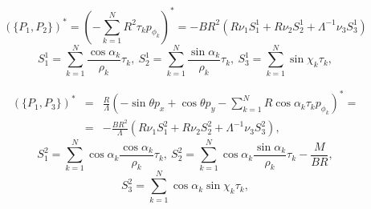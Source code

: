$$
(\{P_1,P_2\})^* = (-\sum\limits_{k=1}^{N} R^2\tau_kp_{\phi_k})^* =
-BR^2(R\nu_1 S_1^1 + R\nu_2 S_2^1 + \Lambda^{-1}\nu_3S_3^1)$$
$$
S_1^1 = \sum\limits_{k=1}^{N}\frac{\cos\alpha_k}{\rho_k}\tau_k,\
S_2^1 = \sum\limits_{k=1}^{N}\frac{\sin\alpha_k}{\rho_k}\tau_k,\
S_3^1 = \sum\limits_{k=1}^{N}\sin\chi_k\tau_k,
$$

\begin{eqnarray*}
(\{P_1,P_3\})^* &=& \frac{R}{\Lambda}\left(-\sin\theta p_x + \cos\theta p_y - \sum\limits_{k=1}^{N} R\cos\alpha_k\tau_kp_{\phi_k}\right)^* =\\
&=& -\frac{BR^2}{\Lambda}(R\nu_1 S_1^2 + R\nu_2 S_2^2 + \Lambda^{-1}\nu_3S_3^2),
\end{eqnarray*}
$$
S_1^2 = \sum\limits_{k=1}^{N}\cos\alpha_k\frac{\cos\alpha_k}{\rho_k}\tau_k,\
S_2^2 = \sum\limits_{k=1}^{N}\cos\alpha_k\frac{\sin\alpha_k}{\rho_k}\tau_k - \frac{M}{BR},
$$$$
S_3^2 = \sum\limits_{k=1}^{N}\cos\alpha_k\sin\chi_k\tau_k,
$$

